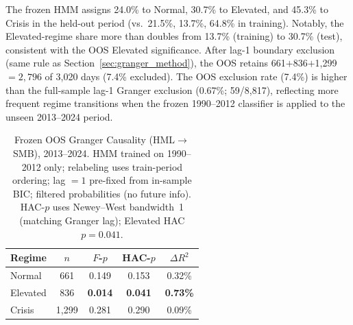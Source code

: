 \documentclass[sigconf,anonymous]{acmart}
\begin{document}
The frozen HMM assigns 24.0\% to Normal, 30.7\% to Elevated, and 45.3\%
to Crisis in the held-out period (vs.\ 21.5\%, 13.7\%, 64.8\% in training).
Notably, the Elevated-regime share more than doubles from 13.7\% (training)
to 30.7\% (test), consistent with the OOS Elevated significance.
After lag-1 boundary exclusion (same rule as Section~\ref{sec:granger_method}),
the OOS retains 661$+$836$+$1{,}299$=2{,}796$ of 3,020 days (7.4\% excluded).
The OOS exclusion rate (7.4\%) is higher than the full-sample lag-1 Granger exclusion
(0.67\%; 59/8,817), reflecting more frequent regime transitions when the
frozen 1990--2012 classifier is applied to the unseen 2013--2024 period.

\begin{table}[t]
\centering
\setlength{\tabcolsep}{5pt}
\caption{Frozen OOS Granger Causality (HML$\to$SMB), 2013--2024.
HMM trained on 1990--2012 only; relabeling uses train-period ordering;
lag $= 1$ pre-fixed from in-sample BIC; filtered probabilities (no future info).
HAC-$p$ uses Newey--West bandwidth~1 (matching Granger lag); Elevated HAC $p = 0.041$.}
\label{tab:frozen_granger}
\small
\begin{tabular}{@{}lcccc@{}}
\toprule
Regime & $n$ & $F$-$p$ & HAC-$p$ & $\Delta R^2$ \\
\midrule
Normal    & 661 & 0.149 & 0.153 & 0.32\% \\
Elevated  & 836 & \textbf{0.014} & \textbf{0.041} & \textbf{0.73\%} \\
Crisis    & 1,299 & 0.281 & 0.290 & 0.09\% \\
\bottomrule
\end{tabular}
\end{table}
\end{document}

